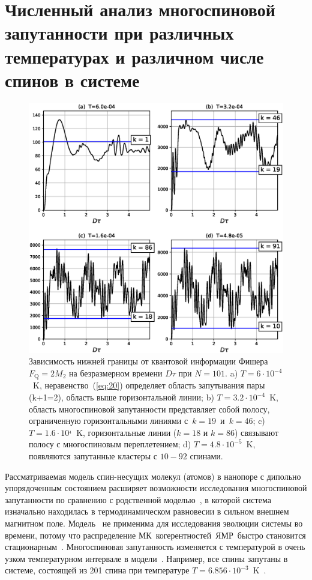 \documentclass[utf8]{jetp}
\begin{document}
\section{Численный анализ многоспиновой запутанности при различных температурах и различном числе спинов в системе}
\label{sec:5}

\begin{figure}
 	\includegraphics[width=0.95\linewidth]{fisher_low_bound_n101.eps}
	\caption{
	  Зависимость нижней границы от квантовой информации Фишера $F_\mathrm{Q} = 2 M_{2}$
	  на безразмерном времени $D\tau$ при $N=101$.
	  a) $T=6\cdot10^{-4}$~K, неравенство~(\ref{eq:20}) определяет область запутывания пары (k+1=2), область выше горизонтальной линии;
	  b) $T=3.2\cdot10^{-4}$~K, область многоспиновой запутанности представляет собой полосу, ограниченную горизонтальными линиями с~$k=19$~и~$k=46$;
	  c) $T = 1.6\cdot10^{_4}$~K, горизонтальные линии ($k=18$ и $k=86$) связывают полосу с многоспиновым переплетением;
	  d) $T=4.8\cdot10^{-5}$~K, появляются запутанные кластеры с $10-92$ спинами.
	}
	\label{fig:2}
\end{figure}

Рассматриваемая модель спин-несущих молекул (атомов) в нанопоре с дипольно упорядоченным состоянием расширяет возможности исследования многоспиновой запутанности по сравнению с родственной моделью~\cite{Doronin_2019},
в которой система изначально находилась в термодинамическом равновесии в сильном внешнем магнитном поле.
Модель~\cite{Doronin_2019} не применима для исследования эволюции системы во времени,
потому что распределение МК~когерентностей~ЯМР~быстро становится стационарным~\cite{Doronin_2009}.
Многоспиновая запутанность изменяется с температурой в очень узком температурном интервале в модели~\cite{Doronin_2019}.
Например, все спины запутаны в системе, состоящей из 201 спина при температуре $T=6.856\cdot10^{-3}$~K~\cite{Doronin_2019}.
\end{document}
